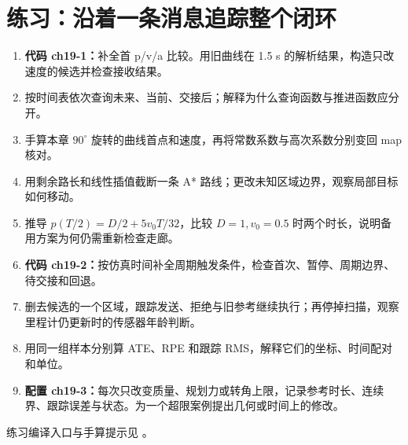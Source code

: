 \section{练习：沿着一条消息追踪整个闭环}
\begin{enumerate}
\item \textbf{代码 ch19-1：}补全首 p/v/a 比较。用旧曲线在 1.5 s 的解析结果，构造只改速度的候选并检查接收结果。
\item 按时间表依次查询未来、当前、交接后；解释为什么查询函数与推进函数应分开。
\item 手算本章 $90^\circ$ 旋转的曲线首点和速度，再将常数系数与高次系数分别变回 map 核对。
\item 用剩余路长和线性插值截断一条 A* 路线；更改未知区域边界，观察局部目标如何移动。
\item 推导 $p(T/2)=D/2+5v_0T/32$，比较 $D=1,v_0=0.5$ 时两个时长，说明备用方案为何仍需重新检查走廊。
\item \textbf{代码 ch19-2：}按仿真时间补全周期触发条件，检查首次、暂停、周期边界、待交接和回退。
\item 删去候选的一个区域，跟踪发送、拒绝与旧参考继续执行；再停掉扫描，观察里程计仍更新时的传感器年龄判断。
\item 用同一组样本分别算 ATE、RPE 和跟踪 RMS，解释它们的坐标、时间配对和单位。
\item \textbf{配置 ch19-3：}每次只改变质量、规划力或转角上限，记录参考时长、连续界、跟踪误差与状态。为一个超限案例提出几何或时间上的修改。
\end{enumerate}
练习编译入口与手算提示见 。
